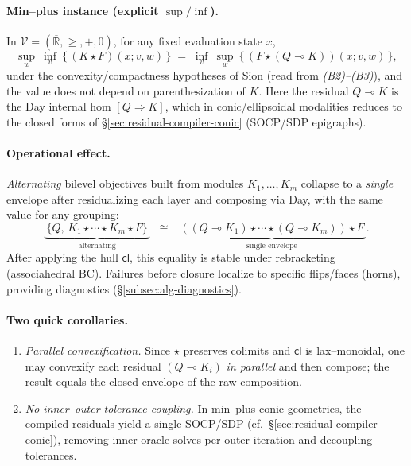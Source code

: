 \documentclass[11pt]{article}
\numberwithin{equation}{section}
\theoremstyle{upright}
\newcommand{\V}{\mathcal{V}}
\begin{document}
\paragraph{Min--plus instance (explicit $\sup/\inf$).}
In $\V=(\overline{\mathbb R},\ge,+,0)$, for any fixed evaluation state $x$,
\[
\sup_{w}\ \inf_{v}\ \Big\{\, (K\star F)(x;v,w) \,\Big\}
\;=\;
\inf_{v}\ \sup_{w}\ \Big\{\, (F\star (Q\multimap K))(x;v,w) \,\Big\},
\]
under the convexity/compactness hypotheses of Sion (read from \emph{(B2)--(B3)}),
and the value does not depend on parenthesization of $K$.
Here the residual $Q\multimap K$ is the Day internal hom $[Q\Rightarrow K]$,
which in conic/ellipsoidal modalities reduces to the closed forms of
\S\ref{sec:residual-compiler-conic} (SOCP/SDP epigraphs).

\paragraph{Operational effect.}
\emph{Alternating} bilevel objectives built from modules $K_1,\ldots,K_m$ collapse to a
\emph{single} envelope after residualizing each layer and composing via Day, with the same
value for any grouping:
\[
\textstyle
\underbrace{\ \{Q,\,K_1\star\cdots\star K_m\star F\}\ }_{\text{alternating}} \;\;\cong\;\;
\underbrace{\ ((Q\multimap K_1)\star\cdots\star(Q\multimap K_m))\star F\ }_{\text{single envelope}}.
\]
After applying the hull $\mathsf{cl}$, this equality is stable under rebracketing (associahedral BC).
Failures before closure localize to specific flips/faces (horns), providing diagnostics
(\S\ref{subsec:alg-diagnostics}).

\paragraph{Two quick corollaries.}
\begin{enumerate}[leftmargin=*, itemsep=.25ex]
\item \emph{Parallel convexification.} Since $\star$ preserves colimits and $\mathsf{cl}$ is
  lax–monoidal, one may convexify each residual $(Q\multimap K_i)$ \emph{in parallel} and
  then compose; the result equals the closed envelope of the raw composition.
\item \emph{No inner--outer tolerance coupling.} In min–plus conic geometries,
  the compiled residuals yield a single SOCP/SDP (cf.\ \S\ref{sec:residual-compiler-conic}),
  removing inner oracle solves per outer iteration and decoupling tolerances.
\end{enumerate}
\end{document}
